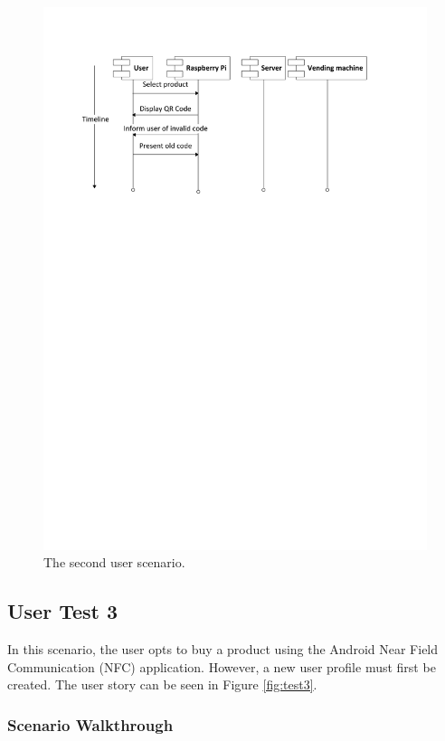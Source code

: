 \begin{figure}
 \centering 
 \includegraphics[clip=true, trim = 0 550 0 70,
 scale=0.7]{user_story_2}
 \caption{The second user scenario.}
 \label{fig:test2}
\end{figure}

\subsection{User Test 3}

In this scenario, the user opts to buy a product using the Android Near Field
Communication (NFC) application. However, a new user profile must first be created. The user story
can be seen in Figure \ref{fig:test3}.

\subsubsection{Scenario Walkthrough}

